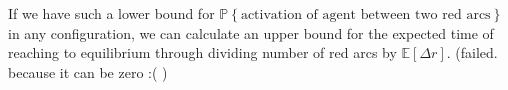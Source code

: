 \documentclass[]{book}
\theoremstyle{definition}
\begin{document}
If we have such a lower bound for $\mathbb{P}\left\{ \text{activation of agent between two red arcs} \right\}$ in any configuration, we can calculate an upper bound for the expected time of reaching to equilibrium through dividing number of red arcs by $\mathbb{E}[\Delta r]$. (failed. because it can be zero :( )
\end{document}
